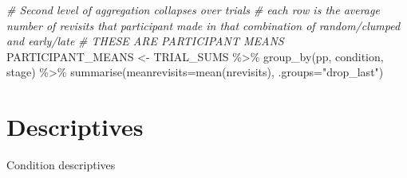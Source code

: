 \documentclass[
]{book}
\newenvironment{Shaded}{\begin{snugshade}}{\end{snugshade}}
\newcommand{\AttributeTok}[1]{\textcolor[rgb]{0.77,0.63,0.00}{#1}}
\newcommand{\CommentTok}[1]{\textcolor[rgb]{0.56,0.35,0.01}{\textit{#1}}}
\newcommand{\FunctionTok}[1]{\textcolor[rgb]{0.00,0.00,0.00}{#1}}
\newcommand{\NormalTok}[1]{#1}
\newcommand{\OtherTok}[1]{\textcolor[rgb]{0.56,0.35,0.01}{#1}}
\newcommand{\SpecialCharTok}[1]{\textcolor[rgb]{0.00,0.00,0.00}{#1}}
\newcommand{\StringTok}[1]{\textcolor[rgb]{0.31,0.60,0.02}{#1}}
\theoremstyle{definition}
\theoremstyle{definition}
\theoremstyle{definition}
\theoremstyle{definition}
\theoremstyle{remark}
\begin{document}
\begin{Shaded}
\begin{Highlighting}[]
\CommentTok{\# Second level of aggregation collapses over trials}
\CommentTok{\# each row is the average number of revisits that participant made in that combination of random/clumped and early/late}
\CommentTok{\# THESE ARE PARTICIPANT MEANS}
\NormalTok{PARTICIPANT\_MEANS }\OtherTok{\textless{}{-}} 
\NormalTok{  TRIAL\_SUMS }\SpecialCharTok{\%\textgreater{}\%} 
  \FunctionTok{group\_by}\NormalTok{(pp, condition, stage) }\SpecialCharTok{\%\textgreater{}\%} 
  \FunctionTok{summarise}\NormalTok{(}\AttributeTok{meanrevisits=}\FunctionTok{mean}\NormalTok{(nrevisits), }\AttributeTok{.groups=}\StringTok{"drop\_last"}\NormalTok{)}
\end{Highlighting}
\end{Shaded}

\hypertarget{descriptives}{%
\section{Descriptives}\label{descriptives}}

Condition descriptives
\end{document}
